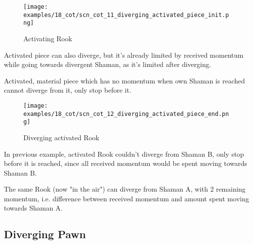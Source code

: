 \vspace*{-1.4\baselineskip}
\noindent
\begin{figure}[!h]
\texttt{[image: examples/18\_cot/scn\_cot\_11\_diverging\_activated\_piece\_init.png]}
\vspace*{-1.3\baselineskip}
\caption{Activating Rook}
\label{fig:scn_cot_11_diverging_activated_piece_init}
\end{figure}

\vspace*{-0.4\baselineskip}
Activated piece can also diverge, but it's already limited by received momentum
while going towards divergent Shaman, as it's limited after diverging.

Activated, material piece which has no momentum when own Shaman is reached cannot
diverge from it, only stop before it.

\clearpage %

\vspace*{-2.1\baselineskip}
\noindent
\begin{figure}[!h]
\texttt{[image: examples/18\_cot/scn\_cot\_12\_diverging\_activated\_piece\_end.png]}
\vspace*{-1.3\baselineskip}
\caption{Diverging activated Rook}
\label{fig:scn_cot_12_diverging_activated_piece_end}
\end{figure}

\vspace*{-0.4\baselineskip}
In previous example, activated Rook couldn't diverge from Shaman B, only stop before
it is reached, since all received momentum would be spent moving towards Shaman B.

The same Rook (now "in the air") can diverge from Shaman A, with 2 remaining momentum,
i.e. difference between received momentum and amount spent moving towards Shaman A.

\clearpage %

\subsection*{Diverging Pawn}
\label{sec:Conquest of Tlalocan/Divergence/Diverging Pawn/2} %


